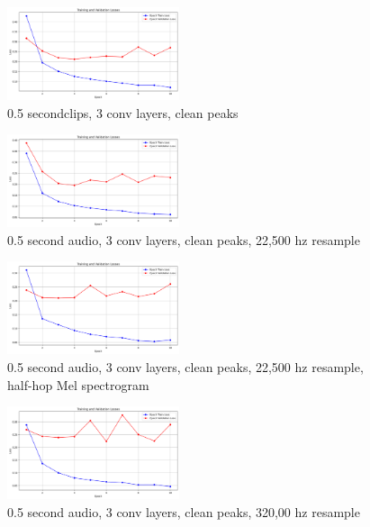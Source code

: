 \documentclass[twocolumn]{article}
\begin{document}
\begin{figure}
\centering
\includegraphics[width=0.45\textwidth]{figures/loss_plot_halfs_3conv_cleanpeaks.png}
\caption{0.5 secondclips, 3 conv layers, clean peaks}
\label{fig:halfs_3conv_cleanpeaks}
\end{figure}

\begin{figure}
\centering
\includegraphics[width=0.45\textwidth]{figures/loss_plot_halfs_3conv_cleanpeaks_22500resample.png}
\caption{0.5 second audio, 3 conv layers, clean peaks, 22,500 hz resample}
\label{fig:halfs_3conv_cleanpeaks_22500hz}
\end{figure}

\begin{figure}
\centering
\includegraphics[width=0.45\textwidth]{figures/loss_plot_halfs_3conv_cleanpeaks_22500resample_halfhop.png}
\caption{0.5 second audio, 3 conv layers, clean peaks, 22,500 hz resample, half-hop Mel spectrogram}
\label{fig:halfs_3conv_cleanpeaks_22500hz_halfhop}
\end{figure}

\begin{figure}
\centering
\includegraphics[width=0.45\textwidth]{figures/loss_plot_halfs_3conv_cleanpeaks_32000resample.png}
\caption{0.5 second audio, 3 conv layers, clean peaks, 320,00 hz resample}
\label{fig:halfs_3conv_cleanpeaks_32000hz}
\end{figure}
\end{document}
